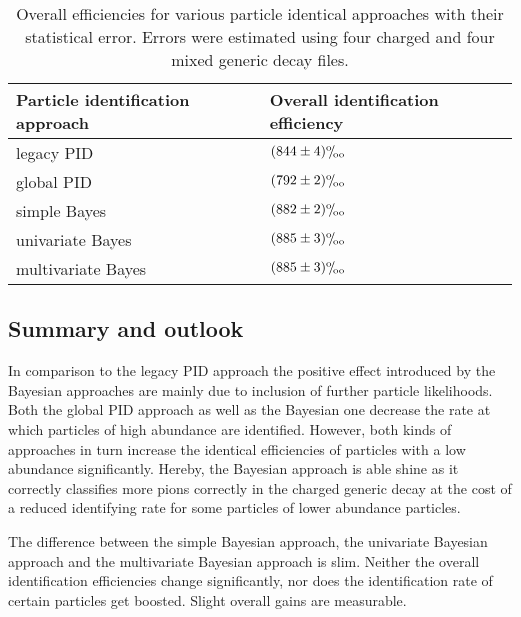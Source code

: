 \begin{table}[ht]
	\centering
	\begin{tabular}{l|l}
		Particle identification approach & Overall identification efficiency \\
		\hline
		legacy PID & $(844 \pm 4) {}^\text{o}\mkern-5mu/\mkern-3mu_\text{oo}$ \\ %
		global PID & $(792 \pm 2) {}^\text{o}\mkern-5mu/\mkern-3mu_\text{oo}$ \\ %
		simple Bayes & $(882 \pm 2) {}^\text{o}\mkern-5mu/\mkern-3mu_\text{oo}$ \\ %
		univariate Bayes & $(885 \pm 3) {}^\text{o}\mkern-5mu/\mkern-3mu_\text{oo}$ \\ %
		multivariate Bayes & $(885 \pm 3) {}^\text{o}\mkern-5mu/\mkern-3mu_\text{oo}$ %
	\end{tabular}
	\caption{Overall efficiencies for various particle identical approaches with their statistical error. Errors were estimated using four charged and four mixed generic decay files.}
	\label{tab:overall_efficiencies}
\end{table}

\subsection{Summary and outlook}
\label{subsc:bayesian_approach_summary}

In comparison to the legacy PID approach the positive effect introduced by the Bayesian approaches are mainly due to inclusion of further particle likelihoods. Both the global PID approach as well as the Bayesian one decrease the rate at which particles of high abundance are identified. However, both kinds of approaches in turn increase the identical efficiencies of particles with a low abundance significantly. Hereby, the Bayesian approach is able shine as it correctly classifies more pions correctly in the charged generic decay at the cost of a reduced identifying rate for some particles of lower abundance particles.

The difference between the simple Bayesian approach, the univariate Bayesian approach and the multivariate Bayesian approach is slim. Neither the overall identification efficiencies change significantly, nor does the identification rate of certain particles get boosted. Slight overall gains are measurable.

